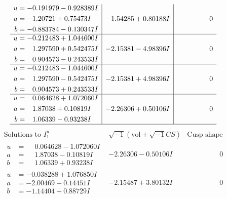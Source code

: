 \documentclass[1p]{elsarticle_modified}
\theoremstyle{definition}
\newcommand{\I}{\sqrt{-1}}
\begin{document}
$$\begin{array}{c|c|c}
\begin{aligned}
u &= -0.191979 - 0.928389 I \\
a &= -1.20721 + 0.75473 I \\
b &= -0.883784 - 0.130347 I\end{aligned}
 & -1.54285 + 0.80188 I & \phantom{-0.000000 } 0 \\ \hline\begin{aligned}
u &= -0.212483 + 1.044600 I \\
a &= \phantom{-}1.297590 + 0.542475 I \\
b &= \phantom{-}0.904573 - 0.243533 I\end{aligned}
 & -2.15381 - 4.98396 I & \phantom{-0.000000 } 0 \\ \hline\begin{aligned}
u &= -0.212483 - 1.044600 I \\
a &= \phantom{-}1.297590 - 0.542475 I \\
b &= \phantom{-}0.904573 + 0.243533 I\end{aligned}
 & -2.15381 + 4.98396 I & \phantom{-0.000000 } 0 \\ \hline\begin{aligned}
u &= \phantom{-}0.064628 + 1.072060 I \\
a &= \phantom{-}1.87038 + 0.10819 I \\
b &= \phantom{-}1.06339 - 0.93238 I\end{aligned}
 & -2.26306 + 0.50106 I & \phantom{-0.000000 } 0\\
 \hline 
 \end{array}$$\newpage$$\begin{array}{c|c|c}  
\text{Solutions to }I^u_{1}& \I (\text{vol} + \sqrt{-1}CS) & \text{Cusp shape}\\
 \hline 
\begin{aligned}
u &= \phantom{-}0.064628 - 1.072060 I \\
a &= \phantom{-}1.87038 - 0.10819 I \\
b &= \phantom{-}1.06339 + 0.93238 I\end{aligned}
 & -2.26306 - 0.50106 I & \phantom{-0.000000 } 0 \\ \hline\begin{aligned}
u &= -0.038288 + 1.076850 I \\
a &= -2.00469 - 0.14451 I \\
b &= -1.14404 + 0.88729 I\end{aligned}
 & -2.15487 + 3.80132 I & \phantom{-0.000000 } 0 \\ \hline\begin{aligned}

\end{aligned}
\end{array}$$
\end{document}
